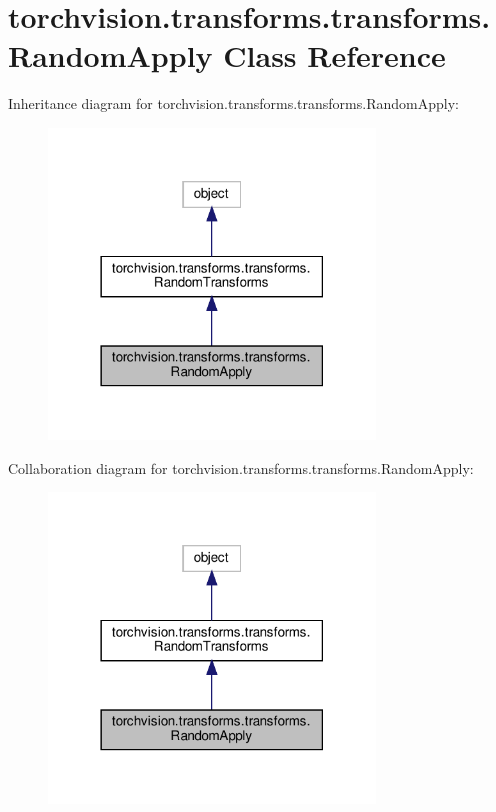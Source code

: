 \hypertarget{classtorchvision_1_1transforms_1_1transforms_1_1RandomApply}{}\section{torchvision.\+transforms.\+transforms.\+Random\+Apply Class Reference}
\label{classtorchvision_1_1transforms_1_1transforms_1_1RandomApply}


Inheritance diagram for torchvision.\+transforms.\+transforms.\+Random\+Apply\+:
\nopagebreak
\begin{figure}[H]
\begin{center}
\leavevmode
\includegraphics[width=246pt]{classtorchvision_1_1transforms_1_1transforms_1_1RandomApply__inherit__graph}
\end{center}
\end{figure}


Collaboration diagram for torchvision.\+transforms.\+transforms.\+Random\+Apply\+:
\nopagebreak
\begin{figure}[H]
\begin{center}
\leavevmode
\includegraphics[width=246pt]{classtorchvision_1_1transforms_1_1transforms_1_1RandomApply__coll__graph}
\end{center}
\end{figure}
